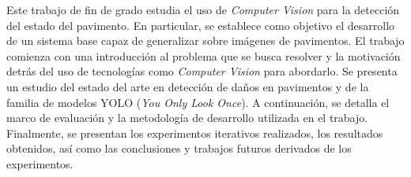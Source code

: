 
Este trabajo de fin de grado estudia el uso de \textit{Computer Vision} para la detección del estado del pavimento. En particular, se establece como objetivo el desarrollo de un sistema base capaz de generalizar sobre imágenes de pavimentos. El trabajo comienza con una introducción al problema que se busca resolver y la motivación detrás del uso de tecnologías como \textit{Computer Vision} para abordarlo. Se presenta un estudio del estado del arte en detección de daños en pavimentos y de la familia de modelos YOLO (\textit{You Only Look Once}). A continuación, se detalla el marco de evaluación y la metodología de desarrollo utilizada en el trabajo. Finalmente, se presentan los experimentos iterativos realizados, los resultados obtenidos, así como las conclusiones y trabajos futuros derivados de los experimentos.


